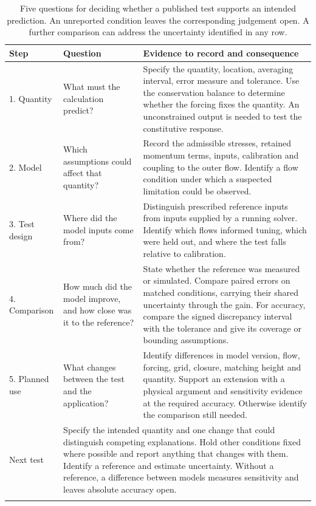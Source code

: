 \begin{table}[t]
\caption{Five questions for deciding whether a published test supports an intended prediction. An unreported condition leaves the corresponding judgement open. A further comparison can address the uncertainty identified in any row.}\label{tab:checklist}
\footnotesize
\begin{tabular*}{\textwidth}{@{\extracolsep{\fill}}p{}p{}p{}@{}}
\toprule
Step & Question & Evidence to record and consequence \\
\midrule
1. Quantity & What must the calculation predict? & Specify the quantity, location, averaging interval, error measure and tolerance. Use the conservation balance to determine whether the forcing fixes the quantity. An unconstrained output is needed to test the constitutive response. \\
2. Model & Which assumptions could affect that quantity? & Record the admissible stresses, retained momentum terms, inputs, calibration and coupling to the outer flow. Identify a flow condition under which a suspected limitation could be observed. \\
3. Test design & Where did the model inputs come from? & Distinguish prescribed reference inputs from inputs supplied by a running solver. Identify which flows informed tuning, which were held out, and where the test falls relative to calibration. \\
4. Comparison & How much did the model improve, and how close was it to the reference? & State whether the reference was measured or simulated. Compare paired errors on matched conditions, carrying their shared uncertainty through the gain. For accuracy, compare the signed discrepancy interval with the tolerance and give its coverage or bounding assumptions. \\
5. Planned use & What changes between the test and the application? & Identify differences in model version, flow, forcing, grid, closure, matching height and quantity. Support an extension with a physical argument and sensitivity evidence at the required accuracy. Otherwise identify the comparison still needed. \\
\midrule
Next test & \multicolumn{2}{p{0.85\textwidth}}{Specify the intended quantity and one change that could distinguish competing explanations. Hold other conditions fixed where possible and report anything that changes with them. Identify a reference and estimate uncertainty. Without a reference, a difference between models measures sensitivity and leaves absolute accuracy open.} \\
\botrule
\end{tabular*}
\end{table}
